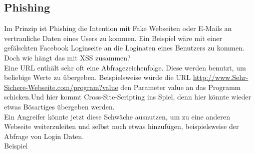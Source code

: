 \subsection{Phishing}
\label{sec:xss_phishing}
Im Prinzip ist Phishing die Intention mit Fake Webseiten oder E-Mails an vertrauliche Daten eines Users zu kommen. Ein Beispiel wäre mit einer gefälschten Facebook Loginseite an die Loginaten eines Benutzers zu kommen.\\Doch wie hängt das mit XSS zusammen?\\Eine URL enthält sehr oft eine Abfragezeichenfolge. Diese werden benutzt, um beliebige Werte zu übergeben. Beispielsweise würde die URL
\url{ http://www.Sehr-Sichere-Webseite.com/program?value} den Parameter value an das Programm schicken.Und hier kommt Cross-Site-Scripting ins Spiel, denn hier könnte wieder etwas Bösartiges übergeben werden.\\Ein Angreifer könnte jetzt diese Schwäche ausnutzen, um zu eine anderen Webseite weiterzuleiten und selbst noch etwas hinzufügen, beispielsweise der Abfrage von Login Daten. \\Beispiel\\
